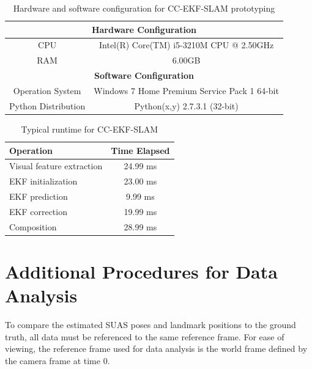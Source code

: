 \begin{table}[h]
\caption{Hardware and software configuration for CC-EKF-SLAM prototyping}
\label{tab:hardware}
\centering
\begin{tabular}{|c|c|}
\hline
\multicolumn{2}{|c|}{\textbf{Hardware Configuration}} \\ \hline
CPU & Intel(R) Core(TM) i5-3210M CPU @ 2.50GHz \\ \hline
RAM & 6.00GB \\ \hline \hline
\multicolumn{2}{|c|}{\textbf{Software Configuration}} \\ \hline
Operation System & Windows 7 Home Premium Service Pack 1 64-bit \\ \hline
Python Distribution & Python(x,y) 2.7.3.1 (32-bit) \\ \hline
\end{tabular}
\end{table}

\begin{table}[h]
\caption{Typical runtime for CC-EKF-SLAM}
\label{tab:runtime}
\centering
\begin{tabular}{|l|c|}
\hline
Operation & Time Elapsed\\ \hline
Visual feature extraction & 24.99 ms \\ \hline
EKF initialization & 23.00 ms \\ \hline
EKF prediction & 9.99 ms \\ \hline
EKF correction & 19.99 ms \\ \hline
Composition & 28.99 ms \\ \hline
\end{tabular}
\end{table}
\FloatBarrier

\section{Additional Procedures for Data Analysis}
To compare the estimated SUAS poses and landmark positions to the ground
truth, all data must be referenced to the same reference frame. For
ease of viewing, the reference frame used for data analysis is the
world frame defined by the camera frame at time 0. 

